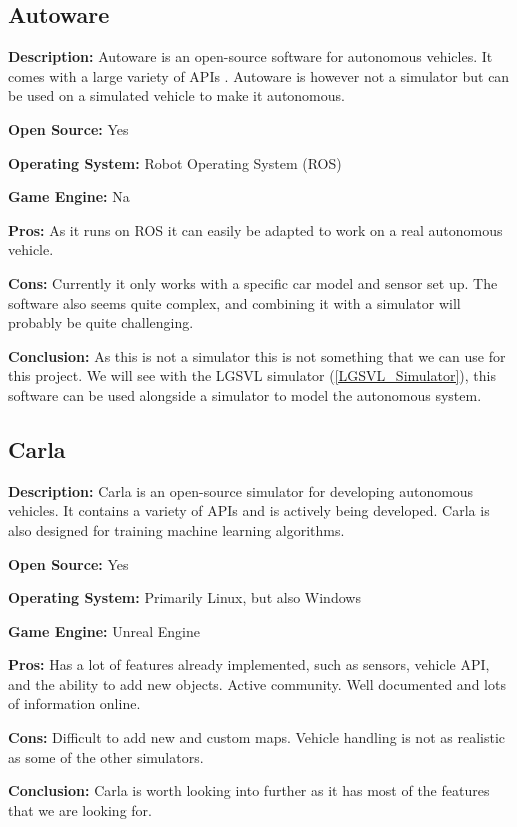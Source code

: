 \subsection{Autoware} \label{Autoware}
\textbf{Description:} Autoware is an open-source software for autonomous vehicles. It comes with a large variety of APIs  \cite{Autoware_doc_Website}. Autoware is however not a simulator but can be used on a simulated vehicle to make it autonomous.

\textbf{Open Source:} Yes

\textbf{Operating System:} Robot Operating System (ROS)

\textbf{Game Engine:} Na

\textbf{Pros:} As it runs on ROS it can easily be adapted to work on a real autonomous vehicle.

\textbf{Cons:} Currently it only works with a specific car model and sensor set up. The software also seems quite complex, and combining it with a simulator will probably be quite challenging.

\textbf{Conclusion:} As this is not a simulator this is not something that we can use for this project. We will see with the LGSVL simulator (\ref{LGSVL_Simulator}), this software can be used alongside a simulator to model the autonomous system. 


\subsection{Carla}
\textbf{Description:} Carla is an open-source simulator for developing autonomous vehicles. It contains a variety of APIs and is actively being developed. Carla is also designed for training machine learning algorithms. 

\textbf{Open Source:} Yes

\textbf{Operating System:} Primarily Linux, but also Windows

\textbf{Game Engine:} Unreal Engine

\textbf{Pros:} Has a lot of features already implemented, such as sensors, vehicle API, and the ability to add new objects. Active community. Well documented and lots of information online. 

\textbf{Cons:} Difficult to add new and custom maps. Vehicle handling is not as realistic as some of the other simulators.

\textbf{Conclusion:} Carla is worth looking into further as it has most of the features that we are looking for.


